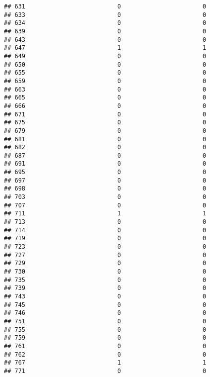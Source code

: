 \documentclass[
]{article}
\begin{document}
\begin{verbatim}
## 631                          0                       0
## 633                          0                       0
## 634                          0                       0
## 639                          0                       0
## 643                          0                       0
## 647                          1                       1
## 649                          0                       0
## 650                          0                       0
## 655                          0                       0
## 659                          0                       0
## 663                          0                       0
## 665                          0                       0
## 666                          0                       0
## 671                          0                       0
## 675                          0                       0
## 679                          0                       0
## 681                          0                       0
## 682                          0                       0
## 687                          0                       0
## 691                          0                       0
## 695                          0                       0
## 697                          0                       0
## 698                          0                       0
## 703                          0                       0
## 707                          0                       0
## 711                          1                       1
## 713                          0                       0
## 714                          0                       0
## 719                          0                       0
## 723                          0                       0
## 727                          0                       0
## 729                          0                       0
## 730                          0                       0
## 735                          0                       0
## 739                          0                       0
## 743                          0                       0
## 745                          0                       0
## 746                          0                       0
## 751                          0                       0
## 755                          0                       0
## 759                          0                       0
## 761                          0                       0
## 762                          0                       0
## 767                          1                       1
## 771                          0                       0

\end{verbatim}
\end{document}
